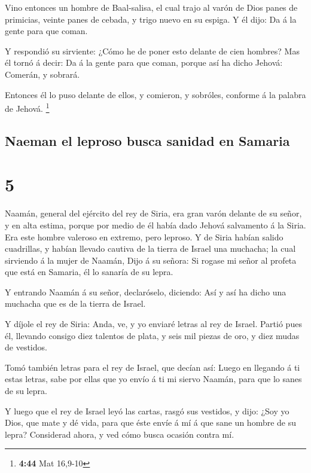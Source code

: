  Vino entonces un hombre de Baal-salisa, el cual trajo al
varón de Dios panes de primicias, veinte panes de cebada, y trigo nuevo
en su espiga. Y él dijo: Da á la gente para que coman.

 Y respondió su sirviente: ¿Cómo he de poner esto delante
de cien hombres? Mas él tornó á decir: Da á la gente para que coman,
porque así ha dicho Jehová: Comerán, y sobrará.

 Entonces él lo puso delante de ellos, y comieron, y
sobróles, conforme á la palabra de Jehová. \footnote{\textbf{4:44} Mat
  16,9-10}

\hypertarget{naeman-el-leproso-busca-sanidad-en-samaria}{%
\subsection{Naeman el leproso busca sanidad en
Samaria}\label{naeman-el-leproso-busca-sanidad-en-samaria}}

\hypertarget{section-4}{%
\section{5}\label{section-4}}

 Naamán, general del ejército del rey de Siria, era gran
varón delante de su señor, y en alta estima, porque por medio de él
había dado Jehová salvamento á la Siria. Era este hombre valeroso en
extremo, pero leproso.  Y de Siria habían salido
cuadrillas, y habían llevado cautiva de la tierra de Israel una
muchacha; la cual sirviendo á la mujer de Naamán,  Dijo á
su señora: Si rogase mi señor al profeta que está en Samaria, él lo
sanaría de su lepra.

 Y entrando Naamán á su señor, declaróselo, diciendo: Así
y así ha dicho una muchacha que es de la tierra de Israel.

 Y díjole el rey de Siria: Anda, ve, y yo enviaré letras
al rey de Israel. Partió pues él, llevando consigo diez talentos de
plata, y seis mil piezas de oro, y diez mudas de vestidos.

 Tomó también letras para el rey de Israel, que decían
así: Luego en llegando á ti estas letras, sabe por ellas que yo envío á
ti mi siervo Naamán, para que lo sanes de su lepra.

 Y luego que el rey de Israel leyó las cartas, rasgó sus
vestidos, y dijo: ¿Soy yo Dios, que mate y dé vida, para que éste envíe
á mí á que sane un hombre de su lepra? Considerad ahora, y ved cómo
busca ocasión contra mí.

